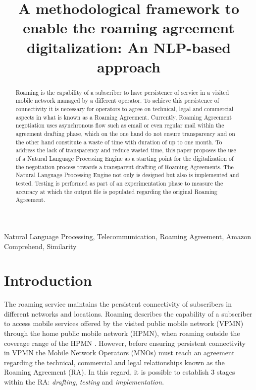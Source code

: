 \documentclass[conference]{style/IEEEtran}
\begin{document}
\title{A methodological framework to enable the roaming agreement digitalization: An NLP-based approach\\}

\maketitle

\begin{abstract}
Roaming is the capability of a subscriber to have persistence of service in a visited mobile network managed by a different operator. To achieve this persistence of connectivity it is necessary for operators to agree on technical, legal and commercial aspects in what is known as a Roaming Agreement. Currently, Roaming Agreement negotiation uses asynchronous flow such as email or even regular mail within the agreement drafting phase, which on the one hand do not ensure transparency and on the other hand constitute a waste of time with duration of up to one month. To address the lack of transparency and reduce wasted time, this paper proposes the use of a Natural Language Processing Engine as a starting point for the digitalization of the negotiation process towards a transparent drafting of Roaming Agreements. The Natural Language Processing Engine not only is designed but also is implemented and tested. Testing is performed as part of an experimentation phase to measure the accuracy at which the output file is populated regarding the original Roaming Agreement.
\end{abstract}

\begin{IEEEkeywords}
Natural Language Processing, Telecommunication, Roaming Agreement, Amazon Comprehend, Similarity
\end{IEEEkeywords}

\section{Introduction}
The roaming service maintains the persistent connectivity of subscribers in different networks and locations. Roaming describes the capability of a subscriber to access mobile services offered by the visited public mobile network (VPMN) through the home public mobile network (HPMN), when roaming outside the coverage range of the HPMN \cite{Tanaka2013}. However, before ensuring persistent connectivity in VPMN the Mobile Network Operators (MNOs) must reach an agreement regarding the technical, commercial and legal relationships known as the Roaming Agreement (RA). In this regard, it is possible to establish 3 stages within the RA: \textit{drafting}, \textit{testing} and \textit{implementation}.
\end{document}

